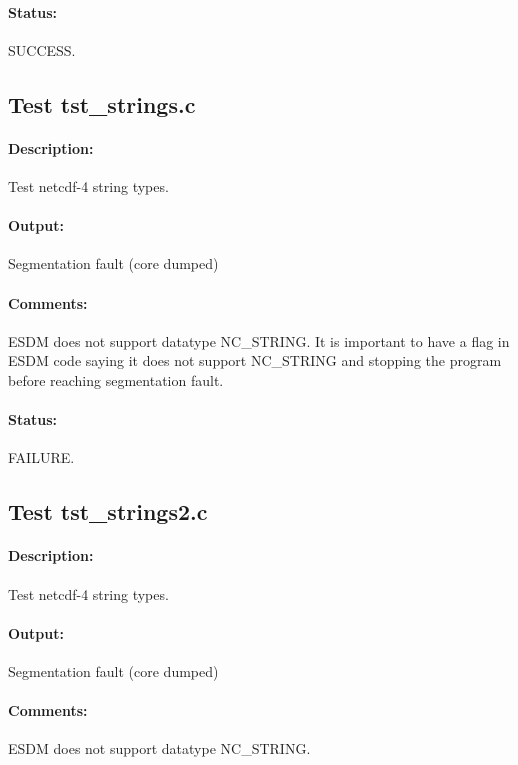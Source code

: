 \paragraph{Status:} SUCCESS.

\subsection{Test tst\_strings.c}

\paragraph{Description:} Test netcdf-4 string types.

\paragraph{Output:} Segmentation fault (core dumped)

\paragraph{Comments:} ESDM does not support datatype NC\_STRING.
It is important to have a flag in ESDM code saying it does not support NC\_STRING and stopping the program before reaching segmentation fault.

\paragraph{Status:} FAILURE.

\subsection{Test tst\_strings2.c}

\paragraph{Description:} Test netcdf-4 string types.

\paragraph{Output:} Segmentation fault (core dumped)

\paragraph{Comments:} ESDM does not support datatype NC\_STRING.

